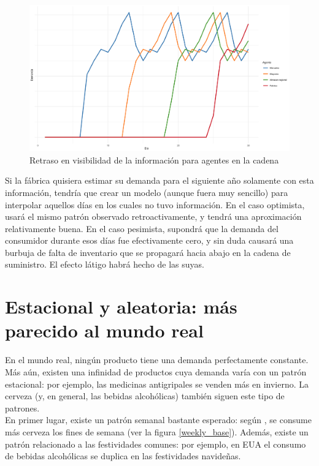 \begin{figure}[ht!]
\caption{Retraso en visibilidad de la informaci\'on para agentes en la cadena}
\label{analytic_2}
\includegraphics[width=12cm]{tesis_tex/figs/analytic_solution_0_all_45_inv.png}
\centering
\end{figure}

Si la f\'abrica quisiera estimar su demanda para el siguiente a\~no solamente con esta informaci\'on, tendr\'ia que crear un modelo (aunque fuera muy sencillo) para interpolar aquellos d\'ias en los cuales no tuvo informaci\'on. En el caso optimista, usar\'a el mismo patr\'on observado retroactivamente, y tendr\'a una aproximaci\'on relativamente buena. En el caso pesimista, supondr\'a que la demanda del consumidor durante esos d\'ias fue efectivamente cero, y sin duda causar\'a una burbuja de falta de inventario que se propagar\'a hacia abajo en la cadena de suministro. El efecto l\'atigo habr\'a hecho de las suyas.\\

\section{Estacional y aleatoria: m\'as parecido al mundo real}

En el mundo real, ning\'un producto tiene una demanda perfectamente constante. M\'as a\'un, existen una infinidad de productos cuya demanda var\'ia con un patr\'on estacional: por ejemplo, las medicinas antigripales se venden m\'as en invierno. La cerveza (y, en general, las bebidas alcoh\'olicas) tambi\'en siguen este tipo de patrones.\\

En primer lugar, existe un patr\'on semanal bastante esperado: seg\'un \citet{gallupbeer}, se consume m\'as cerveza los fines de semana (ver la figura \ref{weekly_base}). Adem\'as, existe un patr\'on relacionado a las festividades comunes: por ejemplo, en EUA el consumo de bebidas alcoh\'olicas se duplica en las festividades navide\~nas. \\

